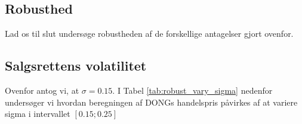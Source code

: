\documentclass{article}
\begin{document}
\begin{appendices}




\section{Robusthed}
\label{sec:antag}
Lad os til slut undersøge robustheden af de forskellige antagelser gjort ovenfor. 

\subsection{Salgsrettens volatilitet}

Ovenfor antog vi, at $\sigma=0.15$. I Tabel \ref{tab:robust_vary_sigma} nedenfor undersøger vi hvordan beregningen af DONGs handelspris påvirkes af at variere sigma i intervallet $\left[ 0.15; 0.25 \right]$


\end{appendices}
\end{document}
